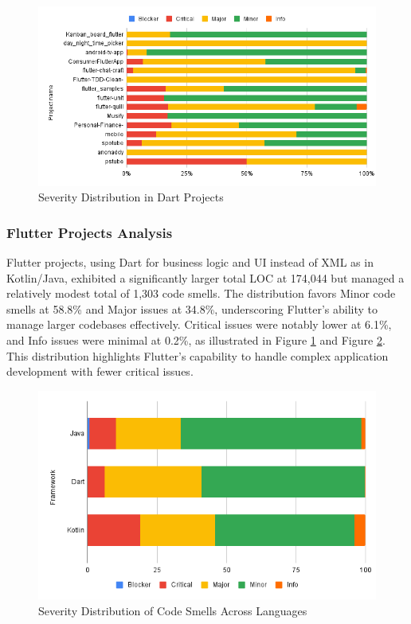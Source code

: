 \begin{figure}[htbp]
    \centering
    \includegraphics[scale = 0.58]{img/FLUTTERSOLO.png}
    \caption{Severity Distribution in Dart Projects}
    \label{fig:dartsolo}
\end{figure}
\subsubsection{Flutter Projects Analysis}
Flutter projects, using Dart for business logic and UI instead of XML as in Kotlin/Java, exhibited a significantly larger total LOC at 174,044 but managed a relatively modest total of 1,303 code smells. The distribution favors Minor code smells at 58.8\% and Major issues at 34.8\%, underscoring Flutter's ability to manage larger codebases effectively. Critical issues were notably lower at 6.1\%, and Info issues were minimal at 0.2\%, as illustrated in Figure \ref{fig:dartsolo} and Figure \ref*{fig:totalsolo}. This distribution highlights Flutter's capability to handle complex application development with fewer critical issues.
 

\begin{figure}[htbp]
    \centering
    \includegraphics[scale = 0.58]{img/totalsolo.png}
    \caption{Severity Distribution of Code Smells Across Languages}
    \label{fig:totalsolo}
\end{figure}
